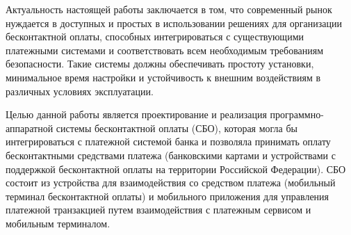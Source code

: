 Актуальность настоящей работы заключается в том, что современный рынок нуждается в доступных и простых в использовании решениях для организации бесконтактной оплаты, способных интегрироваться с существующими платежными системами и соответствовать всем необходимым требованиям безопасности.
Такие системы должны обеспечивать простоту установки, минимальное время настройки и устойчивость к внешним воздействиям в различных условиях эксплуатации.


Целью данной работы является проектирование и реализация программно-аппаратной системы бесконтактной оплаты (СБО), которая могла бы интегрироваться с платежной системой банка и позволяла принимать оплату бесконтактными средствами платежа (банковскими картами и устройствами с поддержкой бесконтактной оплаты на территории Российской Федерации).
СБО состоит из устройства для взаимодействия со средством платежа (мобильный терминал бесконтактной оплаты) и мобильного приложения для управления платежной транзакцией путем взаимодействия с платежным сервисом и мобильным терминалом.
